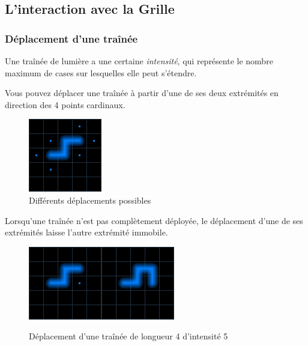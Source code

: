 \subsection{L'interaction avec la Grille}

\subsubsection{Déplacement d'une traînée}

Une traînée de lumière a une certaine \emph{intensité}, qui représente le nombre maximum de cases sur lesquelles elle peut s'étendre.

Vous pouvez déplacer une traînée à partir d'une de ses deux extrémités en direction des 4 points cardinaux.

\begin{figure}[h]
\centering
\includegraphics{positions.png}
\caption{Différents déplacements possibles}
\end{figure}

Lorsqu'une traînée n'est pas complètement déployée, le déplacement d'une de ses extrémités laisse l'autre extrémité immobile.

\begin{figure}[h]
\centering
\includegraphics{deplacement1.png}\hspace{5mm}\includegraphics{deplacement2.png}
\caption{Déplacement d'une traînée de longueur 4 d'intensité 5}
\end{figure}


